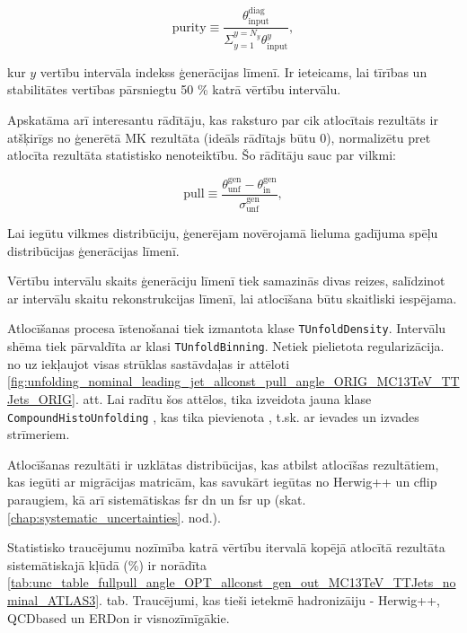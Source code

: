 \begin{equation}
  \text{purity}\equiv\frac{\theta^{\text{diag}}_{\text{input}}}{\Sigma_{y=1}^{y=N_{y}}\theta^{y}_{\text{input}}},
\end{equation}

kur $y$ vertību intervāla indekss ģenerācijas līmenī. Ir ieteicams, lai tīrības un stabilitātes vertības pārsniegtu 50 \% katrā vērtību intervālu.

Apskatāma arī interesantu rādītāju, kas raksturo par cik atlocītais rezultāts ir atšķirīgs no ģenerētā MK rezultāta (ideāls rādītajs būtu 0), normalizētu pret atlocīta rezultāta statistisko nenoteiktību. Šo rādītāju sauc par vilkmi:

\begin{equation}
  \text{pull}\equiv\frac{\theta^{\text{gen}}_{\text{unf}}-\theta^{\text{gen}}_{\text{in}}}{\sigma^{\text{gen}}_{\text{unf}}},
\end{equation}

Lai iegūtu vilkmes distribūciju, ģenerējam novērojamā lieluma gadījuma spēļu distribūcijas ģenerācijas līmenī.

Vērtību intervālu skaits ģenerāciju līmenī tiek samazinās divas reizes, salīdzinot ar intervālu skaitu rekonstrukcijas līmenī, lai atlocīšana būtu skaitliski iespējama.

Atlocīšanas procesa īstenošanai tiek izmantota \ROOT klase \lstinline[language=sh]|TUnfoldDensity|\cite{Schmitt:2012kp}. Intervālu shēma tiek pārvaldīta ar klasi \lstinline[language=sh]|TUnfoldBinning|. Netiek pielietota regularizācija. \pullangle no \leadingjet uz \scndleadingjet iekļaujot visas strūklas sastāvdaļas ir attēloti \ref{fig:unfolding_nominal_leading_jet_allconst_pull_angle_ORIG_MC13TeV_TTJets_ORIG}. att. Lai radītu šos attēlos, tika izveidota jauna klase \lstinline[language=sh]|CompoundHistoUnfolding| \cite{url:compoundhistounfolding}, kas tika pievienota \ROOT, t.sk. ar ievades un izvades strīmeriem.

Atlocīšanas rezultāti ir uzklātas distribūcijas, kas atbilst atlocīšas rezultātiem, kas iegūti ar migrācijas matricām, kas savukārt iegūtas no \ttbar Herwig++ un \ttbar cflip paraugiem, kā arī sistemātiskas \ttbar fsr dn un \ttbar fsr up (skat. \ref{chap:systematic_uncertainties}. nod.).

Statistisko \gls{traucējumu} nozīmība katrā vērtību itervalā kopējā atlocītā rezultāta sistemātiskajā kļūdā  (\%) ir norādīta \ref{tab:unc_table_fullpull_angle_OPT_allconst_gen_out_MC13TeV_TTJets_nominal_ATLAS3}. tab. Traucējumi, kas tieši ietekmē hadronizāiju - \ttbar Herwig++, \ttbar QCDbased un \ttbar ERDon ir visnozīmīgākie.

